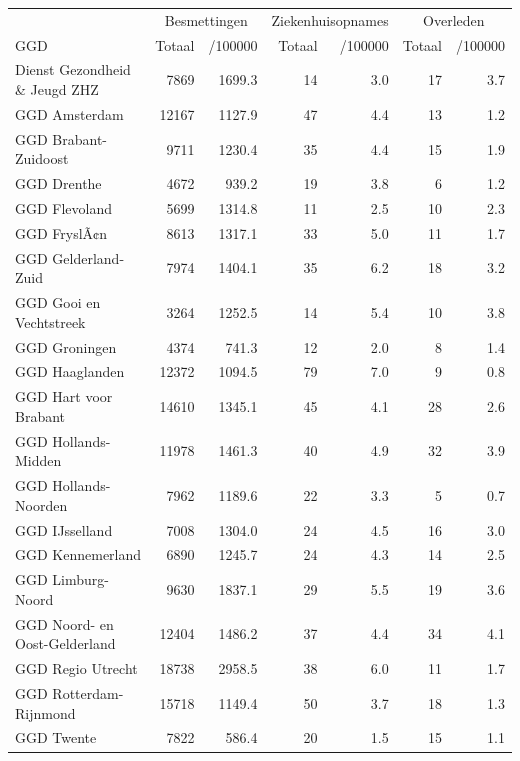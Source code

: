 \documentclass[
  english,
  man,floatsintext]{apa6}
\begin{document}
\begin{table}
\centering\begingroup\fontsize{10}{12}\selectfont

\begin{threeparttable}
\begin{tabular}{lrrrrrr}
\toprule
\multicolumn{1}{c}{ } & \multicolumn{2}{c}{Besmettingen} & \multicolumn{2}{c}{Ziekenhuisopnames} & \multicolumn{2}{c}{Overleden} \\
\cmidrule(l{3pt}r{3pt}){2-3} \cmidrule(l{3pt}r{3pt}){4-5} \cmidrule(l{3pt}r{3pt}){6-7}
GGD & Totaal & /100000 & Totaal & /100000 & Totaal & /100000\\
\midrule
Dienst Gezondheid \& Jeugd ZHZ & 7869 & 1699.3 & 14 & 3.0 & 17 & 3.7\\
GGD Amsterdam & 12167 & 1127.9 & 47 & 4.4 & 13 & 1.2\\
GGD Brabant-Zuidoost & 9711 & 1230.4 & 35 & 4.4 & 15 & 1.9\\
GGD Drenthe & 4672 & 939.2 & 19 & 3.8 & 6 & 1.2\\
GGD Flevoland & 5699 & 1314.8 & 11 & 2.5 & 10 & 2.3\\
GGD FryslÃ¢n & 8613 & 1317.1 & 33 & 5.0 & 11 & 1.7\\
GGD Gelderland-Zuid & 7974 & 1404.1 & 35 & 6.2 & 18 & 3.2\\
GGD Gooi en Vechtstreek & 3264 & 1252.5 & 14 & 5.4 & 10 & 3.8\\
GGD Groningen & 4374 & 741.3 & 12 & 2.0 & 8 & 1.4\\
GGD Haaglanden & 12372 & 1094.5 & 79 & 7.0 & 9 & 0.8\\
GGD Hart voor Brabant & 14610 & 1345.1 & 45 & 4.1 & 28 & 2.6\\
GGD Hollands-Midden & 11978 & 1461.3 & 40 & 4.9 & 32 & 3.9\\
GGD Hollands-Noorden & 7962 & 1189.6 & 22 & 3.3 & 5 & 0.7\\
GGD IJsselland & 7008 & 1304.0 & 24 & 4.5 & 16 & 3.0\\
GGD Kennemerland & 6890 & 1245.7 & 24 & 4.3 & 14 & 2.5\\
GGD Limburg-Noord & 9630 & 1837.1 & 29 & 5.5 & 19 & 3.6\\
GGD Noord- en Oost-Gelderland & 12404 & 1486.2 & 37 & 4.4 & 34 & 4.1\\
GGD Regio Utrecht & 18738 & 2958.5 & 38 & 6.0 & 11 & 1.7\\
GGD Rotterdam-Rijnmond & 15718 & 1149.4 & 50 & 3.7 & 18 & 1.3\\
GGD Twente & 7822 & 586.4 & 20 & 1.5 & 15 & 1.1\\

\end{tabular}
\end{threeparttable}
\end{table}
\end{document}
